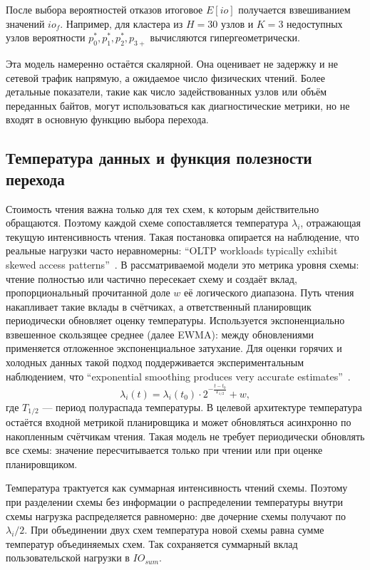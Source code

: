 \begin{center}
\begin{longtable}{|c|c|c|c|c|c|}
\end{longtable}
\end{center}

После выбора вероятностей отказов итоговое \(E[io]\) получается взвешиванием
значений \(io_f\). Например, для кластера из \(H=30\) узлов и \(K=3\)
недоступных узлов вероятности \(p_0^*,p_1^*,p_2^*,p_{3+}\) вычисляются
гипергеометрически.

Эта модель намеренно остаётся скалярной. Она оценивает не задержку и не
сетевой трафик напрямую, а ожидаемое число физических чтений. Более детальные
показатели, такие как число задействованных узлов или объём переданных байтов,
могут использоваться как диагностические метрики, но не входят в основную
функцию выбора перехода.

\subsection{Температура данных и функция полезности перехода}
\label{sec:theory-temperature}

Стоимость чтения важна только для тех схем, к которым действительно обращаются.
Поэтому каждой схеме сопоставляется температура \(\lambda_i\), отражающая
текущую интенсивность чтения. Такая постановка опирается на наблюдение, что
реальные нагрузки часто неравномерны: \enquote{OLTP workloads typically
exhibit skewed access patterns}~\cite{levandoski2013hotcold}. В рассматриваемой модели это метрика уровня
схемы: чтение полностью или частично пересекает схему и создаёт вклад,
пропорциональный прочитанной доле \(w\) её логического диапазона. Путь чтения
накапливает такие вклады в счётчиках, а ответственный планировщик периодически
обновляет оценку температуры. Используется экспоненциально взвешенное скользящее
среднее (далее EWMA): между обновлениями применяется отложенное
экспоненциальное затухание. Для оценки горячих и холодных данных такой подход
поддерживается экспериментальным наблюдением, что \enquote{exponential smoothing
produces very accurate estimates}~\cite{levandoski2013hotcold}.
\[
    \lambda_i(t) =
    \lambda_i(t_0) \cdot 2^{-\frac{t-t_0}{T_{1/2}}} + w,
\]
где \(T_{1/2}\) --- период полураспада температуры. В целевой архитектуре
температура остаётся входной метрикой планировщика и может обновляться
асинхронно по накопленным счётчикам чтения. Такая модель не требует
периодически обновлять все схемы: значение пересчитывается только при чтении
или при оценке планировщиком.

Температура трактуется как суммарная интенсивность чтений схемы. Поэтому при
разделении схемы без информации о распределении температуры внутри схемы нагрузка
распределяется равномерно: две дочерние схемы получают по \(\lambda_i/2\). При
объединении двух схем температура новой схемы равна сумме температур
объединяемых схем. Так сохраняется суммарный вклад пользовательской нагрузки в
\(IO_{sum}\).

